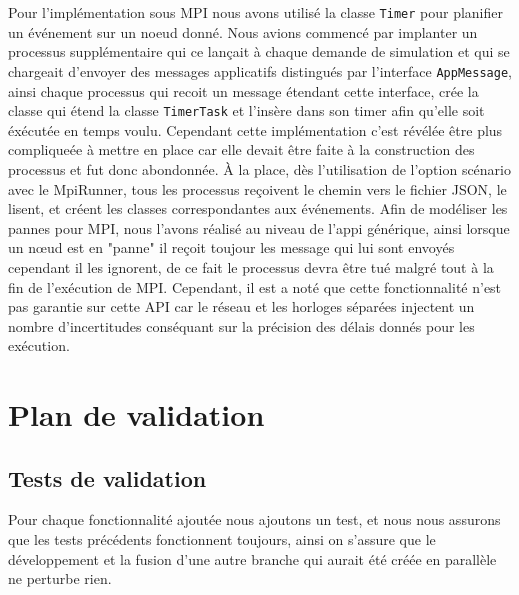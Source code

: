 \documentclass{article}
\begin{document}
				\vspace{5mm}
				Pour l'implémentation sous MPI nous avons utilisé la classe \verb|Timer| pour planifier un événement sur un noeud donné.
				\newline
				Nous avions commencé par implanter un processus supplémentaire qui ce lançait à chaque demande de simulation et qui se chargeait d'envoyer des 
				messages applicatifs distingués par l'interface \verb|AppMessage|, ainsi chaque processus qui recoit un message étendant cette interface, crée la classe 
				qui étend la classe \verb|TimerTask| et l'insère dans son timer afin qu'elle soit éxécutée en temps voulu.
				\newline
				Cependant cette implémentation c'est révélée être plus compliqueée à mettre en place car elle devait être faite à la construction des processus et fut donc abondonnée.
				\newline
				À la place, dès l'utilisation de l'option scénario avec le MpiRunner, tous les processus reçoivent le chemin vers le fichier JSON, le lisent, et créent les classes correspondantes aux événements.
				\newline
				Afin de modéliser les pannes pour MPI, nous l'avons réalisé au niveau de l'appi générique, ainsi lorsque un nœud est en "panne" il reçoit toujour les message qui lui sont envoyés cependant il les ignorent,
				de ce fait le processus devra être tué malgré tout à la fin de l'exécution de MPI.
				Cependant, il est a noté que cette fonctionnalité n'est pas garantie sur cette API car le réseau et les horloges séparées injectent un nombre d'incertitudes conséquant sur la précision des délais donnés 
				pour les exécution.
		
				
		\newpage
		\section{Plan de validation}
			\subsection{Tests de validation}
			Pour chaque fonctionnalité ajoutée nous ajoutons un test, et nous nous assurons que les tests précédents fonctionnent toujours, ainsi on s'assure que le développement et la fusion d'une autre branche qui aurait été créée en parallèle ne perturbe rien.
			\newline
\end{document}
